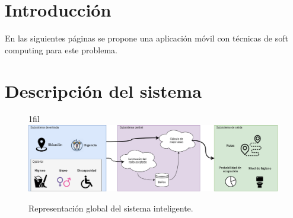 \documentclass[13pt,a4paper]{article}
\makeatletter
\newcommand*{\centerfloat}{%
  \parindent \z@
  \leftskip \z@ \@plus 1fil \@minus \textwidth
  \rightskip\leftskip
  \parfillskip \z@skip}
\makeatother
\begin{document}
    
    






\section{Introducción}





En las siguientes páginas se propone una aplicación móvil con técnicas de soft computing para este problema.

\section{Descripción del sistema}

\begin{figure}[H]
  \centerfloat
  \includegraphics[width=0.99\textwidth]{img/0.png}
  \caption{Representación global del sistema inteligente.}
\end{figure}
\end{document}
